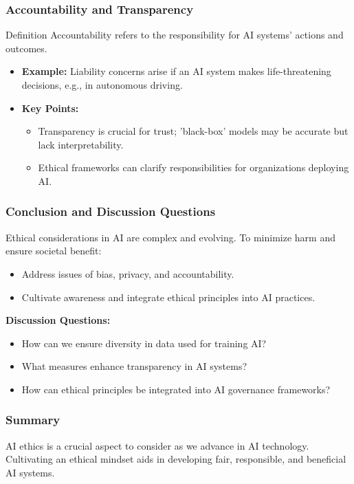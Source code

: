 \documentclass[aspectratio=169]{beamer}
\begin{document}
\begin{frame}[fragile]
    \frametitle{Accountability and Transparency}
    \begin{block}{Definition}
        Accountability refers to the responsibility for AI systems' actions and outcomes.
    \end{block}
    \begin{itemize}
        \item \textbf{Example:} Liability concerns arise if an AI system makes life-threatening decisions, e.g., in autonomous driving.
        \item \textbf{Key Points:}
        \begin{itemize}
            \item Transparency is crucial for trust; 'black-box' models may be accurate but lack interpretability.
            \item Ethical frameworks can clarify responsibilities for organizations deploying AI.
        \end{itemize}
    \end{itemize}
\end{frame}

\begin{frame}[fragile]
    \frametitle{Conclusion and Discussion Questions}
    Ethical considerations in AI are complex and evolving. To minimize harm and ensure societal benefit:
    \begin{itemize}
        \item Address issues of bias, privacy, and accountability.
        \item Cultivate awareness and integrate ethical principles into AI practices.
    \end{itemize}
    \textbf{Discussion Questions:}
    \begin{itemize}
        \item How can we ensure diversity in data used for training AI?
        \item What measures enhance transparency in AI systems?
        \item How can ethical principles be integrated into AI governance frameworks?
    \end{itemize}
\end{frame}

\begin{frame}[fragile]
    \frametitle{Summary}
    AI ethics is a crucial aspect to consider as we advance in AI technology. Cultivating an ethical mindset aids in developing fair, responsible, and beneficial AI systems.
\end{frame}
\end{document}

